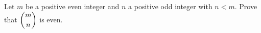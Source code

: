 Let $m$ be a positive even integer and $n$ a positive odd integer with $n<m$. Prove that $\dbinom mn$ is even.
